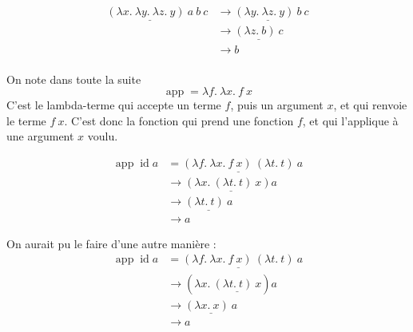 \documentclass[11pt]{article}
\begin{document}
\begin{example}
    \begin{equation*}
    \begin{aligned}
    \underline{\left(\lambda x.~\lambda y.~\lambda z.~y\right)~a}~b~c&\longrightarrow\underline{\left(\lambda y.~\lambda z.~y\right)~b}~c\\
    &\longrightarrow\underline{\left(\lambda z.~b\right)~c}\\
    &\longrightarrow b\\
    \end{aligned}
    \end{equation*}
\end{example}

On note dans toute la suite
$$\operatorname{app} = \lambda f.~\lambda x.~f~x$$
C'est le lambda-terme qui accepte un terme $f$, puis un argument $x$, et qui renvoie le terme $f~x$. C'est donc la fonction qui prend une fonction $f$, et qui l'applique à une argument $x$ voulu.

\begin{example}
    \begin{equation*}
    \begin{aligned}
        \operatorname{app} \operatorname{id} a&=\underline{\left(\lambda f.~\lambda x.~f~x\right)~\left(\lambda t.~t\right)}~a\\
        &\longrightarrow \underline{\left(\lambda x.~\left(\lambda t.~t\right)~x\right) a}\\
        &\longrightarrow \underline{\left(\lambda t.~t\right)~a}\\
        &\longrightarrow a
    \end{aligned}
    \end{equation*}

    On aurait pu le faire d'une autre manière :
    \begin{equation*}
    \begin{aligned}
        \operatorname{app} \operatorname{id} a&=\underline{\left(\lambda f.~\lambda x.~f~x\right)~\left(\lambda t.~t\right)}~a\\
        &\longrightarrow (\lambda x.~\underline{\left(\lambda t.~t\right)~x}) a\\
        &\longrightarrow \underline{\left(\lambda x.~x\right)~a}\\
        &\longrightarrow a
    \end{aligned}
    \end{equation*}
\end{example}
\end{document}
